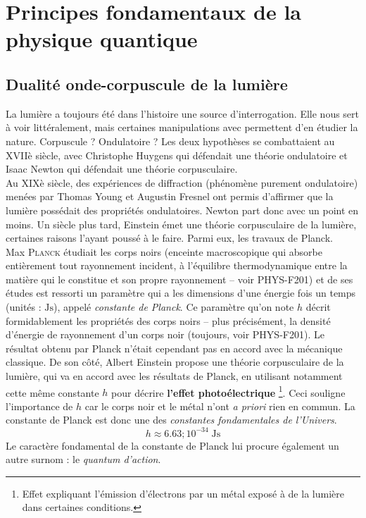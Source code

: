 \documentclass[../notesdecours]{subfiles}
\begin{document}
\chapter{Principes fondamentaux de la physique quantique}\label{chap:chap2}

\section{Dualité onde-corpuscule de la lumière}
La lumière a toujours été dans l'histoire une source d'interrogation. Elle nous sert à voir littéralement, mais certaines manipulations avec permettent d'en étudier la nature. Corpuscule ? Ondulatoire ? Les deux hypothèses se combattaient au XVIIè siècle, avec Christophe Huygens qui défendait une théorie ondulatoire et Isaac Newton qui défendait une théorie corpusculaire. \\

Au XIXè siècle, des expériences de diffraction (phénomène purement ondulatoire) menées par Thomas Young et Augustin Fresnel ont permis d'affirmer que la lumière possédait des propriétés ondulatoires. Newton part donc avec un point en moins. Un siècle plus tard, Einstein émet une théorie corpusculaire de la lumière, certaines raisons l'ayant poussé à le faire. Parmi eux, les travaux de Planck. \\

Max \textsc{Planck} étudiait les corps noirs (enceinte macroscopique qui absorbe entièrement tout rayonnement incident, à l'équilibre thermodynamique entre la matière qui le constitue et son propre rayonnement -- voir PHYS-F201) et de ses études est ressorti un paramètre qui a les dimensions d'une énergie fois un temps (unités : $\mathrm{Js}$), appelé \textit{constante de Planck}. Ce paramètre qu'on note $h$ décrit formidablement les propriétés des corps noirs -- plus précisément, la densité d'énergie de rayonnement d'un corps noir (toujours, voir PHYS-F201). Le résultat obtenu par Planck n'était cependant pas en accord avec la mécanique classique. De son côté, Albert Einstein propose une théorie corpusculaire de la lumière, qui va en accord avec les résultats de Planck, en utilisant notamment cette même constante $h$ pour décrire \textbf{l'effet photoélectrique} \footnote{Effet expliquant l'émission d'électrons par un métal exposé à de la lumière dans certaines conditions.}. Ceci souligne l'importance de $h$ car le corps noir et le métal n'ont \textit{a priori} rien en commun. La constante de Planck est donc une des \textit{constantes fondamentales de l'Univers}.
$$h \approx 6.63 ; 10^{-34} \; \mathrm{Js}$$
Le caractère fondamental de la constante de Planck lui procure également un autre surnom : le \textit{quantum d'action}.
\end{document}
